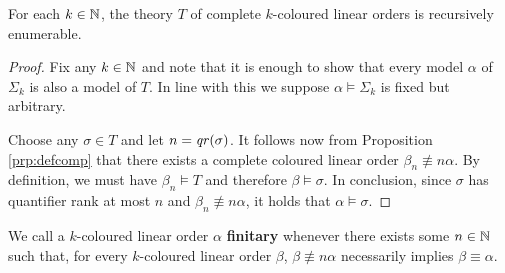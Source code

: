 \begin{prp}
	For each $k\in\nats$, the theory $T$ of complete $k$-coloured linear orders is recursively enumerable.
\end{prp}
\begin{proof}
	Fix any $k\in\nats$ and note that it is enough to show that every model $\alpha$ of $\Sigma_k$ is also a model of $T$.  In line with this we suppose $\alpha\models\Sigma_k$ is fixed but arbitrary.

	Choose any $\sigma\in T$ and let $n=\mathit{qr}(\sigma)$.  It follows now from Proposition \ref{prp:defcomp} that there exists a complete coloured linear order $\beta_n\nequiv{n}\alpha$.  By definition, we must have $\beta_n\models T$ and therefore $\beta\models\sigma$.  In conclusion, since $\sigma$ has quantifier rank at most $n$ and $\beta_n\nequiv{n}\alpha$, it holds that $\alpha\models\sigma$.
\end{proof}


\iffalse
	\begin{dfn}[regularity]
		We call a $k$-coloured linear order $\alpha$, with colours say $r_0,\dotsc,r_{k-1}$, \textbf{regular} whenever \textit{a subset of} its colours form a partition of $\alpha$ and no member of $\alpha$ posesses two distinct colours.  Equivalently, $\alpha$ is regular whenever it holds that:
		\begin{equation}
			\alpha\models\left(\forall x\bigvee_{0\leq i<n}r_i(x)\right)\wedge\left(\neg\exists x\bigvee_{i<j<k}(r_i(x)\wedge r_j(x))\right).
		\end{equation}
	\end{dfn}

	\begin{dfn}[$k$-Pattern]
		A $k$-coloured linear order $\alpha$ is called a $\bm{k}$\textbf{-pattern} whenever $\alpha$ is both regular and finite.  Should $k\in\nats$ be clear from the context we will refer to $\alpha$ as simply being a \textit{pattern}.
	\end{dfn}
\fi

\begin{dfn}[Finitary]
	We call a $k$-coloured linear order $\alpha$ \textbf{finitary} whenever there exists some $n\in\mathbb{N}$ such that, for every $k$-coloured linear order $\beta$, $\beta\nequiv{n}\alpha$ necessarily implies $\beta\equiv\alpha$.
\end{dfn}


